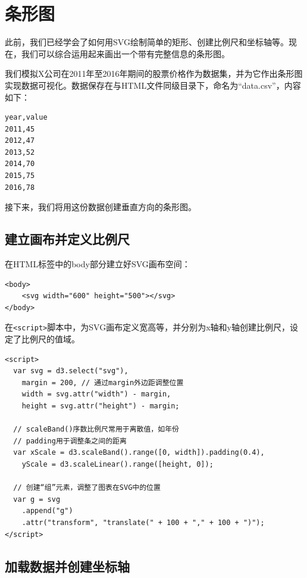 \section{条形图}

此前，我们已经学会了如何用SVG绘制简单的矩形、创建比例尺和坐标轴等。现在，我们可以综合运用起来画出一个带有完整信息的条形图。

我们模拟X公司在2011年至2016年期间的股票价格作为数据集，并为它作出条形图实现数据可视化。数据保存在与HTML文件同级目录下，命名为“data.csv”，内容如下：

\begin{verbatim}
year,value
2011,45
2012,47
2013,52
2014,70
2015,75
2016,78
\end{verbatim}

接下来，我们将用这份数据创建垂直方向的条形图。

\subsection{建立画布并定义比例尺}

在HTML标签中的body部分建立好SVG画布空间：

\begin{verbatim}
<body>
    <svg width="600" height="500"></svg>
</body>
\end{verbatim}

在\verb|<script>|脚本中，为SVG画布定义宽高等，并分别为x轴和y轴创建比例尺，设定了比例尺的值域。

\begin{verbatim}
<script>
  var svg = d3.select("svg"),
    margin = 200, // 通过margin外边距调整位置
    width = svg.attr("width") - margin,
    height = svg.attr("height") - margin;

  // scaleBand()序数比例尺常用于离散值，如年份
  // padding用于调整条之间的距离
  var xScale = d3.scaleBand().range([0, width]).padding(0.4),
    yScale = d3.scaleLinear().range([height, 0]);
  
  // 创建“组”元素，调整了图表在SVG中的位置
  var g = svg
    .append("g")
    .attr("transform", "translate(" + 100 + "," + 100 + ")");
</script>
\end{verbatim}

\subsection{加载数据并创建坐标轴}

